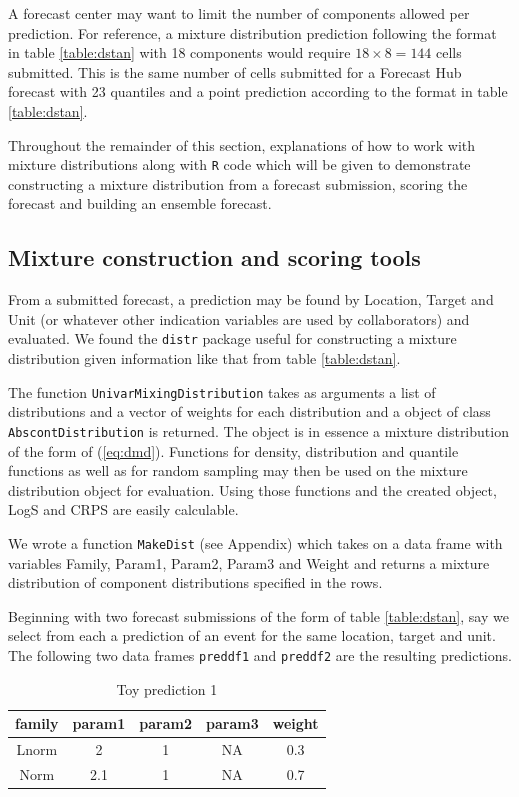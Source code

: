 \documentclass[11pt,notitlepage]{isuthesis}
\begin{document}
A forecast center may want to limit the number of components allowed per 
prediction. For reference, a mixture distribution prediction following the 
format in table \ref{table:dstan} with 18 
components would require $18 \times 8 = 144$ cells submitted. This is the same 
number of cells
submitted for a Forecast Hub forecast with 23 quantiles and a point prediction 
according to the format in table \ref{table:dstan}.

Throughout the remainder of this section, explanations of how to work with 
mixture distributions along with \texttt{R} code which will be given to 
demonstrate constructing a mixture distribution from a forecast submission, 
scoring the forecast and building an ensemble forecast.

\subsection{Mixture construction and scoring tools}
\label{section:tools}

From a submitted forecast, a prediction may be found by Location, Target and 
Unit (or whatever other indication variables are used by collaborators) and 
evaluated. We found
the \texttt{distr} package \cite{camphausen2007distr}
useful for constructing a mixture distribution given
information like that from table \ref{table:dstan}. 

The function 
\texttt{UnivarMixingDistribution} takes as arguments a list of distributions
and a vector of weights for each distribution and a object of class 
\texttt{AbscontDistribution} is returned. The object is in essence a mixture
distribution of the form of (\ref{eq:dmd}). Functions for density, 
distribution
and quantile functions as well as for random sampling may then be used on the
mixture distribution object for evaluation. Using those functions and the 
created object, LogS and CRPS are easily calculable. 

We wrote a function \texttt{MakeDist} (see Appendix)
which takes on a data frame with variables
Family, Param1, Param2, Param3 and Weight and returns a mixture distribution 
of component distributions specified in the rows.

Beginning with two forecast submissions of the form of table \ref{table:dstan}, 
say we select from each a prediction of an event for the same location, target
and unit. The following two data frames \texttt{preddf1} and \texttt{preddf2}
are the resulting predictions.

\begin{table}[h!]
\centering
 \begin{tabular}{|c|c|c|c|c|}
 \hline
    family & param1 & param2 & param3 & weight
    \\ \hline
    Lnorm & 2 & 1 & NA & 0.3  \\
    Norm & 2.1 & 1 & NA & 0.7 \\
 \hline
 \end{tabular}
 \caption[Toy prediction 1]{Toy prediction 1}
 \label{tab:preddf1}
\end{table}
\end{document}
